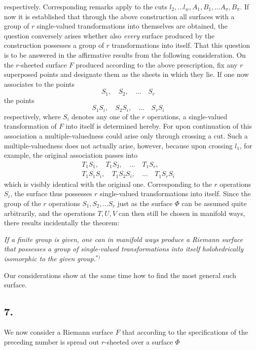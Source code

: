 \documentclass{article}
\begin{document}
respectively. Corresponding remarks apply to the cuts $l_2, \dots l_w, A_1, B_1, \dots A_\pi, B_\pi$. If now it is established that through the above construction all surfaces with a group of $r$ single-valued transformations into themselves are obtained, the question conversely arises whether also \emph{every} surface produced by the construction possesses a group of $r$ transformations into itself. That this question is to be answered in the affirmative results from the following consideration. On the $r$-sheeted surface $F$ produced according to the above prescription, fix any $r$ superposed points and designate them as the sheets in which they lie. If one now associates to the points
\[
S_1, \quad S_2, \quad \dots \quad S_r
\]
the points
\[
S_1 S_i, \quad S_2 S_i, \quad \dots \quad S_r S_i
\]
respectively, where $S_i$ denotes any one of the $r$ operations, a single-valued transformation of $F$ into itself is determined hereby. For upon continuation of this association a multiple-valuedness could arise only through crossing a cut. Such a multiple-valuedness does not actually arise, however, because upon crossing $l_1$, for example, the original association passes into
\[
\begin{gathered}
T_1 S_1, \quad T_1 S_2, \quad \dots \quad T_1 S_r, \\
T_1 S_1 S_i, \quad T_1 S_2 S_i, \quad \dots \quad T_1 S_r S_i
\end{gathered}
\]
which is visibly identical with the original one. Corresponding to the $r$ operations $S_i$, the surface thus possesses $r$ single-valued transformations into itself. Since the group of the $r$ operations $S_1, S_2, \dots S_r$ just as the surface $\Phi$ can be assumed quite arbitrarily, and the operations $T, U, V$ can then still be chosen in manifold ways, there results incidentally the theorem:

\emph{If a finite group is given, one can in manifold ways produce a Riemann surface that possesses a group of single-valued transformations into itself holohedrically isomorphic to the given group.}${}^{*)}$

Our considerations show at the same time how to find the most general such surface.

\subsection*{7.}

We now consider a Riemann surface $F$ that according to the specifications of the preceding number is spread out $r$-sheeted over a surface $\Phi$
\end{document}
